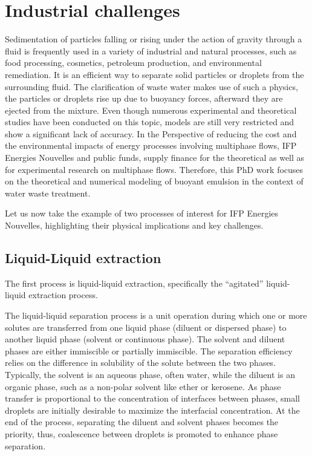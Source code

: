 


\section{Industrial challenges} 


Sedimentation of particles falling or rising under the action of gravity through a fluid is frequently used in a variety of industrial and natural processes, such as food processing, cosmetics, petroleum production, and environmental remediation. 
It is an efficient way to separate solid particles or droplets from the surrounding fluid. 
The clarification of waste water makes use of such a physics, the particles or droplets rise up due to buoyancy forces, afterward they are ejected from the mixture.
Even though numerous experimental and theoretical studies have been conducted on this topic, models are still very restricted and show a significant lack of accuracy. 
In the Perspective of reducing the cost and the environmental impacts of energy processes involving multiphase flows, IFP Energies Nouvelles and public funds, supply finance for the theoretical as well as for experimental research on multiphase flows.
Therefore, this PhD work focuses on the theoretical and numerical modeling of buoyant emulsion in the context of water waste treatment.  

Let us now take the example of two processes of interest for IFP Energies Nouvelles, highlighting their physical implications and key challenges.  


\subsection{Liquid-Liquid extraction}


The first process is liquid-liquid extraction, specifically the ``agitated'' liquid-liquid extraction process. 

The liquid-liquid separation process is a unit operation during which one or more solutes are transferred from one liquid phase (diluent or dispersed phase) to another liquid phase (solvent or continuous phase).
The solvent and diluent phases are either immiscible or partially immiscible.
The separation efficiency relies on the difference in solubility of the solute between the two phases.
Typically, the solvent is an aqueous phase, often water, while the diluent is an organic phase, such as a non-polar solvent like ether or kerosene.
As phase transfer is proportional to the concentration of interfaces between phases, small droplets are initially desirable to maximize the interfacial concentration.
At the end of the process, separating the diluent and solvent phases becomes the priority, thus, coalescence between droplets is promoted to enhance phase separation.

